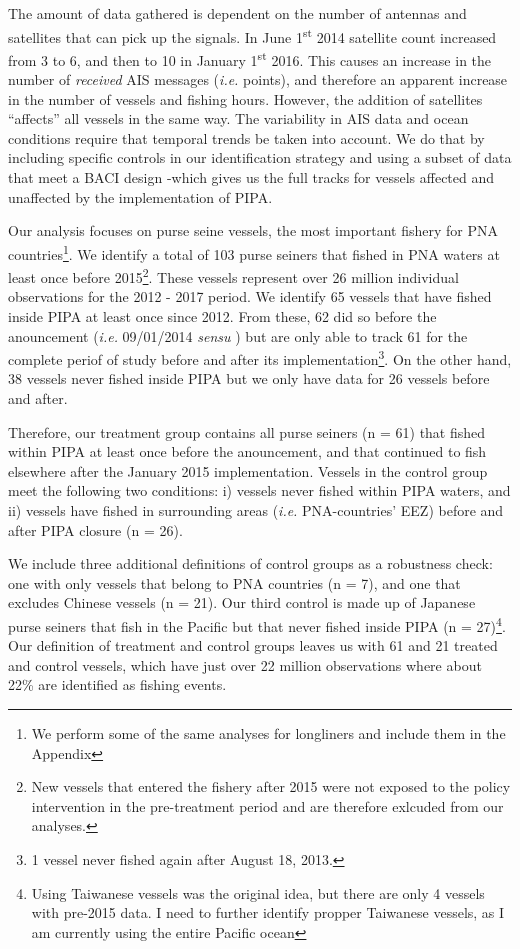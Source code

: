 \documentclass[11pt,]{article}
\let\rmarkdownfootnote\footnote%
\def\footnote{\protect\rmarkdownfootnote}
\begin{document}
The amount of data gathered is dependent on the number of antennas and
satellites that can pick up the signals. In June 1\textsuperscript{st}
2014 satellite count increased from 3 to 6, and then to 10 in January
1\textsuperscript{st} 2016. This causes an increase in the number of
\emph{received} AIS messages (\emph{i.e.} points), and therefore an
apparent increase in the number of vessels and fishing hours. However,
the addition of satellites ``affects'' all vessels in the same way. The
variability in AIS data and ocean conditions require that temporal
trends be taken into account. We do that by including specific controls
in our identification strategy and using a subset of data that meet a
BACI design -which gives us the full tracks for vessels affected and
unaffected by the implementation of PIPA.

Our analysis focuses on purse seine vessels, the most important fishery
for PNA
countries\footnote{We perform some of the same analyses for longliners and include them in the Appendix}.
We identify a total of 103 purse seiners that fished in PNA waters at
least once before
2015\footnote{New vessels that entered the fishery after 2015 were not exposed to the policy intervention in the pre-treatment period and are therefore exlcuded from our analyses.}.
These vessels represent over 26 million individual observations for the
2012 - 2017 period. We identify 65 vessels that have fished inside PIPA
at least once since 2012. From these, 62 did so before the anouncement
(\emph{i.e.} 09/01/2014 \emph{sensu} \citep{mcdermott_2018}) but are
only able to track 61 for the complete periof of study before and after
its
implementation\footnote{1 vessel never fished again after August 18, 2013.}.
On the other hand, 38 vessels never fished inside PIPA but we only have
data for 26 vessels before and after.

Therefore, our treatment group contains all purse seiners (n = 61) that
fished within PIPA at least once before the anouncement, and that
continued to fish elsewhere after the January 2015 implementation.
Vessels in the control group meet the following two conditions: i)
vessels never fished within PIPA waters, and ii) vessels have fished in
surrounding areas (\emph{i.e.} PNA-countries' EEZ) before and after PIPA
closure (n = 26).

We include three additional definitions of control groups as a
robustness check: one with only vessels that belong to PNA countries (n
= 7), and one that excludes Chinese vessels (n = 21). Our third control
is made up of Japanese purse seiners that fish in the Pacific but that
never fished inside PIPA (n =
27)\footnote{Using Taiwanese vessels was the original idea, but there are only 4 vessels with pre-2015 data. I need to further identify propper Taiwanese vessels, as I am currently using the entire Pacific ocean}.
Our definition of treatment and control groups leaves us with 61 and 21
treated and control vessels, which have just over 22 million
observations where about 22\% are identified as fishing events.
\end{document}
